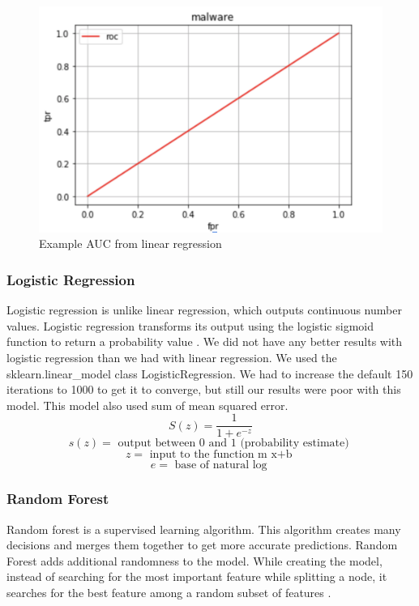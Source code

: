 \documentclass[sigconf]{acmart}
\begin{document}
 \begin{figure}
  \includegraphics[width=\linewidth]{linear.PNG}
  \caption{Example AUC from linear regression}
  \label{fig:linear}
\end{figure}

\subsubsection{Logistic Regression}
Logistic regression is unlike linear regression, which outputs continuous number values. Logistic regression transforms its output using the logistic sigmoid function to return a probability value \cite{logic:2019}. We did not have any better results with logistic regression than we had with linear regression. We used the sklearn.linear\_model class LogisticRegression. We had to increase the default 150 iterations to 1000 to get it to converge, but still our results were poor with this model. This model also used sum of mean squared error.
\begin{equation}
S(z)=\frac{1}{1+e^{-z}}
\end{equation}
\begin{equation}
s(z)=\text { output between } 0 \text { and } 1 \text { (probability estimate) }
\end{equation}
\begin{equation}
z=\text { input to the function m x+b }
\end{equation}
\begin{equation}
e=\text { base of natural log }
\end{equation}
\subsubsection{Random Forest}
Random forest is a supervised learning algorithm. This algorithm creates many decisions and merges them together to get more accurate predictions. Random Forest adds additional randomness to the model. While creating the model, instead of searching for the most important feature while splitting a node, it searches for the best feature among a random subset of features \cite{random:2019}. 
\end{document}
